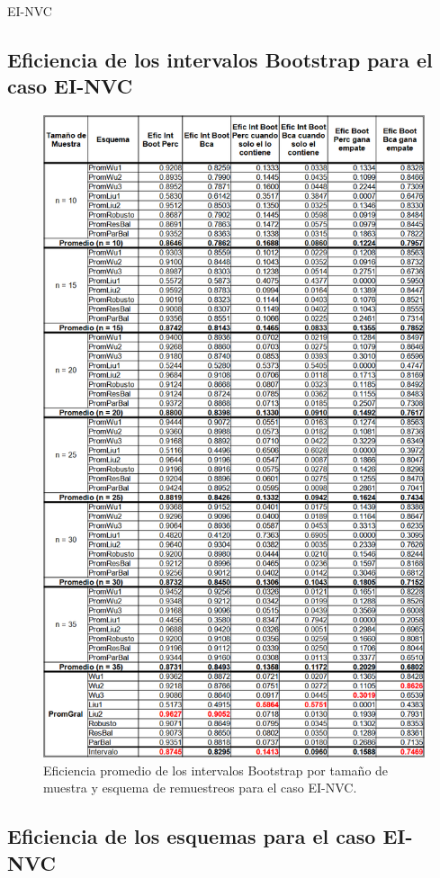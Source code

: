 EI-NVC
\subsection{Eficiencia de los intervalos Bootstrap para el caso EI-NVC}

\begin{figure}[ht] 
	\centering 
	\includegraphics[width=0.75\linewidth]{img/EI_NVC_Efic_Boots.png} 
	\caption{Eficiencia promedio de los intervalos Bootstrap por tamaño de muestra y esquema de remuestreos para el caso EI-NVC.} 
	\label{fig:EI_NVC_Boots}
\end{figure}

\subsection{Eficiencia de los esquemas para el caso EI-NVC}

